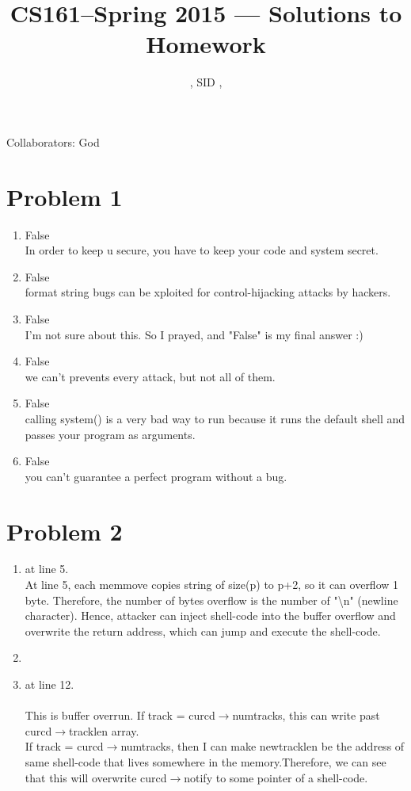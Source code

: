 \documentclass[11pt]{article}
\title{CS161--Spring 2015 --- Solutions to Homework \Homework}
\author{\Name, SID \SID, \texttt{\Login}}
\newenvironment{qparts}{\begin{enumerate}[{(}a{)}]}{\end{enumerate}}
\begin{document}
\maketitle

Collaborators: God

\section*{Problem 1}

\begin{qparts}
\item
False\\
In order to keep u secure, you have to keep your code and system secret.
\item
False\\
format string bugs can be xploited for control-hijacking attacks by hackers.

\item
False\\
I'm not sure about this. So I prayed, and "False" is my final answer :)

\item
False\\
we can't prevents every attack, but not all of them. 
\item
False\\
calling system() is a very bad way to run because it runs the default shell and passes your program as arguments. 

\item
False\\
you can't guarantee a perfect program without a bug.



\end{qparts}

\newpage
\section*{Problem 2}
\begin{qparts}
\item
{} at line 5.\\
At line 5, each memmove copies string of size(p) to p+2, so it can overflow 1 byte. Therefore, the number of bytes overflow is the number of "\textbackslash n" (newline character). Hence, attacker can inject shell-code into the buffer overflow and overwrite the return address, which can jump and execute the shell-code.

\item
{}\\


\item
{} at line 12.\\
\\
This is buffer overrun. If track = curcd$\rightarrow$numtracks, this can write past curcd$\rightarrow$tracklen array.\\
If track = curcd$\rightarrow$numtracks, then I can make newtracklen be the address of same shell-code that lives somewhere in the memory.Therefore, we can see that this will overwrite curcd$\rightarrow$notify to some pointer of a shell-code.

\end{qparts}
\newpage
\end{document}
